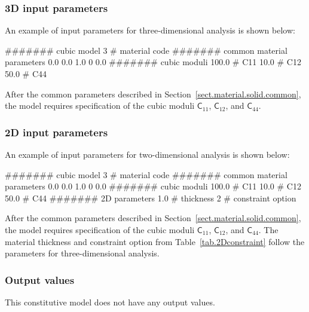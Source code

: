 \subsubsection{3D input parameters}
An example of input parameters for three-dimensional analysis is shown 
below:
\begin{inputfile}
####### cubic model
3     # material code
####### common material parameters
0.0    0.0    1.0
0      0.0
####### cubic moduli
100.0 # C11
 10.0 # C12
 50.0 # C44
\end{inputfile}
After the common parameters described in 
Section~\ref{sect.material.solid.common}, the 
model requires specification of the cubic moduli
$\mathsf{C}_{11}$, $\mathsf{C}_{12}$, and
$\mathsf{C}_{44}$.

\subsubsection{2D input parameters}
An example of input parameters for two-dimensional analysis is shown 
below:
\begin{inputfile}
####### cubic model
3     # material code
####### common material parameters
0.0    0.0    1.0
0      0.0
####### cubic moduli
100.0 # C11
 10.0 # C12
 50.0 # C44
####### 2D parameters
1.0   # thickness
2     # constraint option
\end{inputfile}
After the common parameters described in 
Section~\ref{sect.material.solid.common}, the 
model requires specification of the cubic moduli
$\mathsf{C}_{11}$, $\mathsf{C}_{12}$, and
$\mathsf{C}_{44}$.
The material thickness and 
constraint option from Table~\ref{tab.2Dconstraint} 
follow the parameters for three-dimensional analysis.

\subsubsection{Output values}
This constitutive model does not have any output values.

